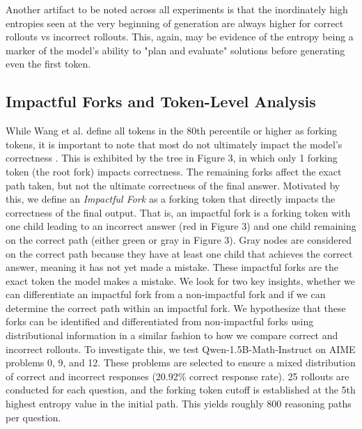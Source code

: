 \documentclass{article}
\begin{document}
Another artifact to be noted across all experiments is that the inordinately high entropies seen at the very beginning of generation are always higher for correct rollouts vs incorrect rollouts. This, again, may be evidence of the entropy being a marker of the model's ability to "plan and evaluate" solutions before generating even the first token.

\subsection{Impactful Forks and Token-Level Analysis}

While Wang et al. define all tokens in the 80th percentile or higher as forking tokens, it is important to note that most do not ultimately impact the model’s correctness \cite{wang_beyond_2025}. This is exhibited by the tree in Figure 3, in which only 1 forking token (the root fork) impacts correctness. The remaining forks affect the exact path taken, but not the ultimate correctness of the final answer. Motivated by this, we define an \textit{Impactful Fork} as a forking token that directly impacts the correctness of the final output. That is, an impactful fork is a forking token with one child leading to an incorrect answer (red in Figure 3) and one child remaining on the correct path (either green or gray in Figure 3). Gray nodes are considered on the correct path because they have at least one child that achieves the correct answer, meaning it has not yet made a mistake. These impactful forks are the exact token the model makes a mistake. We look for two key insights, whether we can differentiate an impactful fork from a non-impactful fork and if we can determine the correct path within an impactful fork. We hypothesize that these forks can be identified and differentiated from non-impactful forks using distributional information in a similar fashion to how we compare correct and incorrect rollouts. To investigate this, we test Qwen-1.5B-Math-Instruct on AIME problems 0, 9, and 12. These problems are selected to ensure a mixed distribution of correct and incorrect responses (20.92\% correct response rate). 25 rollouts are conducted for each question, and the forking token cutoff is established at the 5th highest entropy value in the initial path. This yields roughly 800 reasoning paths per question.
\end{document}
